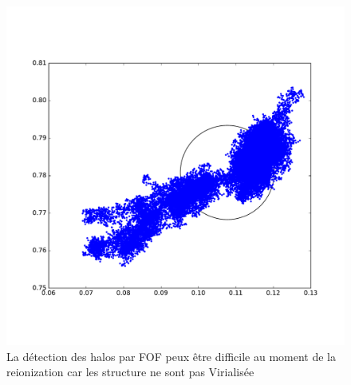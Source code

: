 \begin{figure}[bth]
        \includegraphics[width=.95\textwidth]{img/03/part_halo_R200.pdf} 
        \caption{La détection des halos par FOF peux être difficile au moment de la reionization car les structure ne sont pas Virialisée
        }
 		\label{fig:part_halo}
\end{figure}

